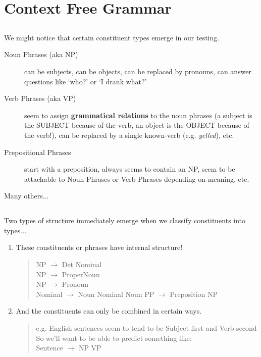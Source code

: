 \documentclass[9pt,xcolor=pdftex,dvipsnames,table]{beamer}
\begin{document}
\section{Context Free Grammar}

\subsection{}
\begin{frame}{}

{\large We might notice that certain constituent types emerge in our testing. }
\vspace{.25cm}
	\begin{description}
		\item[Noun Phrases (aka NP)] can be subjects, can be objects, can be replaced by pronouns, can answer questions like `who?' or `I drank what?'
		\item[Verb Phrases (aka VP)] seem to assign \textbf{grammatical relations} to the noun phrases (a subject is the SUBJECT because of the verb, an object is the OBJECT because of the verb!), can be replaced by a single known-verb (e.g. \emph{yelled}), etc.
		\item[Prepositional Phrases] start with a preposition, always seems to contain an NP, seem to be attachable to Noun Phrases or Verb Phrases depending on meaning, etc.
		\item[Many others...]
	\end{description}
\end{frame}

\subsection{}
\begin{frame}{}

{\large Two types of structure immediately emerge when we classify constituents into types...}
\vspace{.25cm}
	\begin{enumerate}
		\item These constituents or phrases have internal structure!
		\begin{quote}
		NP $\rightarrow$ Det Nominal\\
		NP $\rightarrow$ ProperNoun\\
		NP $\rightarrow$ Pronoun\\
		Nominal $\rightarrow$ Noun \textpipe{} Nominal Noun
		PP $\rightarrow$ Preposition NP
		\end{quote}
		\item And the constituents can only be combined in certain ways.
		\begin{quote}
		e.g. English sentences seem to tend to be Subject first and Verb second\\
		So we'll want to be able to predict something like:\\
		Sentence $\rightarrow$ NP VP
		\end{quote}
	\end{enumerate}
\end{frame}
\end{document}
